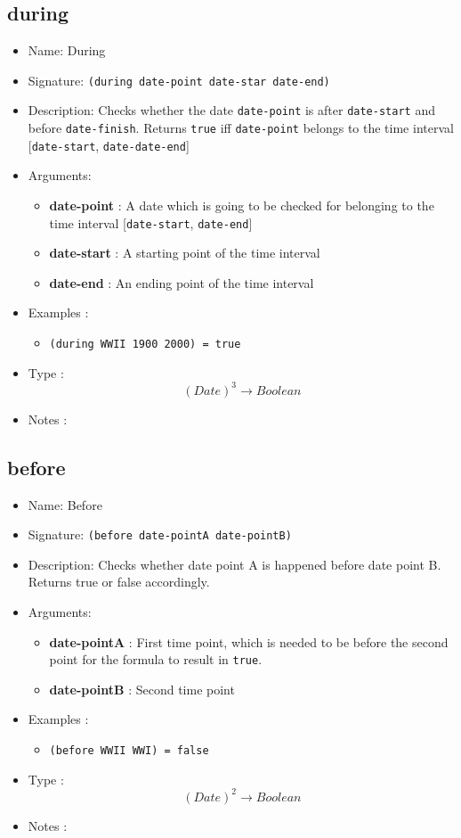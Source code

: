 \subsection{during}
\begin{itemize}
    \item Name: During
    \item Signature: \texttt{(during date-point date-star date-end)}
    \item Description: Checks whether the date \texttt{date-point} is after \texttt{date-start} and before \texttt{date-finish}. Returns \texttt{true} iff \texttt{date-point} belongs to the time interval [\texttt{date-start}, \texttt{date-date-end}]
    \item Arguments:
        \begin{itemize}
            \item \textbf{date-point} : A date which is going to be checked for belonging to the time interval [\texttt{date-start}, \texttt{date-end}]
            \item \textbf{date-start} : A starting point of the time interval
            \item \textbf{date-end} : An ending point of the time interval
        \end{itemize}
    \item Examples :
        \begin{itemize}
            \item \texttt{(during WWII 1900 2000) = true}
        \end{itemize}
    \item Type : \[(Date)^3 \to Boolean\]
    \item Notes :
\end{itemize}

\subsection{before}
\begin{itemize}
    \item Name: Before
    \item Signature: \texttt{(before date-pointA date-pointB)}
    \item Description: Checks whether date point A is happened before date point B. Returns true or false accordingly.
    \item Arguments:
        \begin{itemize}
            \item \textbf{date-pointA} : First time point, which is needed to be before the second point for the formula to result in \texttt{true}.
            \item \textbf{date-pointB} : Second time point
        \end{itemize}
    \item Examples :
        \begin{itemize}
            \item \texttt{(before WWII WWI) = false}
        \end{itemize}
    \item Type : \[(Date)^2 \to Boolean\]
    \item Notes :
\end{itemize}

